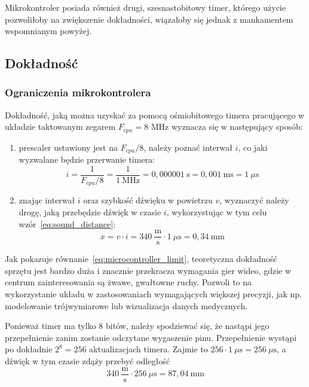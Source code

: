 Mikrokontroler posiada również drugi, szesnastobitowy timer, którego użycie pozwoliłoby na zwiększenie dokładności, wiązałoby się jednak z mankamentem wspomnianym powyżej.

\subsection{Dokładność}\label{section:precision}
\subsubsection{Ograniczenia mikrokontrolera}
\label{section:microcontroller_limit}

Dokładność, jaką można uzyskać za pomocą ośmiobitowego timera pracującego w układzie taktowanym zegarem $F_{cpu} = 8$ MHz wyznacza się w następujący sposób:
\begin{enumerate}
 \item prescaler ustawiony jest na $F_{cpu}/8$, należy poznać interwał $i$, co jaki wyzwalane będzie przerwanie timera:
    \begin{equation}
      i = \frac{1}{F_{cpu}/8} = \frac{1}{1~\textrm{MHz}} = 0,000001~\textrm{s} = 0,001~\textrm{ms} = 1~\mu\textrm{s}
      \label{eq:sampling_frequency}
    \end{equation}

 \item znając interwał $i$ oraz szybkość dźwięku w powietrzu $v$, wyznaczyć należy drogę, jaką przebędzie dźwięk w czasie $i$, wykorzystując w tym celu wzór~\ref{eq:sound_distance}:
    \begin{equation}
      x = v \cdot i = 340~\frac{\textrm{m}}{\textrm{s}} \cdot 1~\mu\textrm{s} = 0,34~\textrm{mm}
      \label{eq:microcontroller_limit}
    \end{equation}
\end{enumerate}

Jak pokazuje równanie~\ref{eq:microcontroller_limit}, teoretyczna dokładność sprzętu jest bardzo duża i znacznie przekracza wymagania gier wideo, gdzie w centrum zainteresowania są żwawe, gwałtowne ruchy. Pozwoli to na wykorzystanie układu w zastosowaniach wymagających większej precyzji, jak np. modelowanie trójwymiarowe lub wizualizacja danych medycznych.

Ponieważ timer ma tylko 8 bitów, należy spodziewać się, że nastąpi jego przepełnienie zanim zostanie odczytane wygaszenie pinu. Przepełnienie wystąpi po dokładnie $2^8 = 256$ aktualizacjach timera. Zajmie to $256 \cdot 1~\mu\textrm{s} = 256~\mu\textrm{s}$, a dźwięk w tym czasie zdąży przebyć odległość 
\begin{equation}
 340~\frac{\textrm{m}}{\textrm{s}} \cdot 256~\mu\textrm{s} = 87,04~\textrm{mm}
\end{equation}

